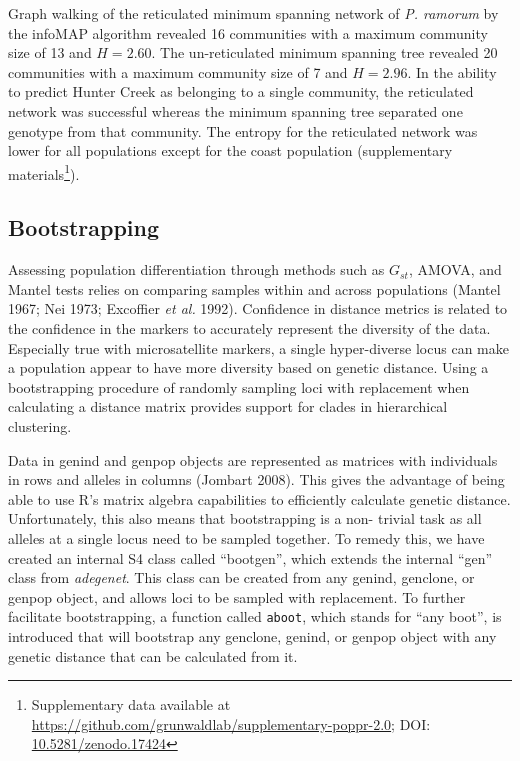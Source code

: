 \documentclass[double,12pt]{beavtex}
\begin{document}
  Graph walking of the reticulated minimum spanning network of \emph{P.
  ramorum} by the infoMAP algorithm revealed 16 communities with a maximum
  community size of 13 and \(H = 2.60\). The un-reticulated minimum
  spanning tree revealed 20 communities with a maximum community size of 7
  and \(H = 2.96\). In the ability to predict Hunter Creek as belonging to
  a single community, the reticulated network was successful whereas the
  minimum spanning tree separated one genotype from that community. The
  entropy for the reticulated network was lower for all populations except
  for the coast population (supplementary materials\footnote{Supplementary
    data available at
    \url{https://github.com/grunwaldlab/supplementary-poppr-2.0}; DOI:
    \href{http://dx.doi.org/10.5281/zenodo.17424}{10.5281/zenodo.17424}}).
  
  \subsection{Bootstrapping}\label{bootstrapping}
  
  Assessing population differentiation through methods such as \(G_{st}\),
  AMOVA, and Mantel tests relies on comparing samples within and across
  populations (Mantel 1967; Nei 1973; Excoffier \emph{et al.} 1992).
  Confidence in distance metrics is related to the confidence in the
  markers to accurately represent the diversity of the data. Especially
  true with microsatellite markers, a single hyper-diverse locus can make
  a population appear to have more diversity based on genetic distance.
  Using a bootstrapping procedure of randomly sampling loci with
  replacement when calculating a distance matrix provides support for
  clades in hierarchical clustering.
  
  Data in genind and genpop objects are represented as matrices with
  individuals in rows and alleles in columns (Jombart 2008). This gives
  the advantage of being able to use R's matrix algebra capabilities to
  efficiently calculate genetic distance. Unfortunately, this also means
  that bootstrapping is a non- trivial task as all alleles at a single
  locus need to be sampled together. To remedy this, we have created an
  internal S4 class called ``bootgen'', which extends the internal ``gen''
  class from \emph{adegenet}. This class can be created from any genind,
  genclone, or genpop object, and allows loci to be sampled with
  replacement. To further facilitate bootstrapping, a function called
  \texttt{aboot}, which stands for ``any boot'', is introduced that will
  bootstrap any genclone, genind, or genpop object with any genetic
  distance that can be calculated from it.
  
\end{document}
